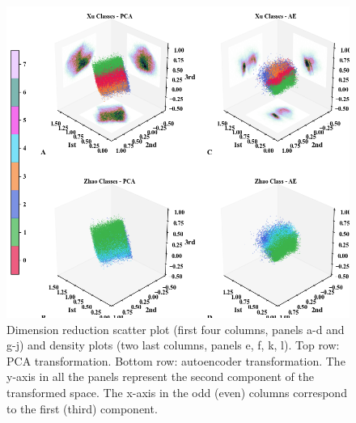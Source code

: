 \documentclass[utf8]{frontiersSCNS} %
\begin{document}
\begin{figure}[h!]
	\begin{center}
		\includegraphics[width=12cm]{Amaya/dimreduc}%
	\end{center}
	\caption{Dimension reduction scatter plot (first four columns, panels a-d and g-j) and density plots (two last columns, panels e, f, k, l). Top row: PCA transformation. Bottom row: autoencoder transformation. The y-axis in all the panels represent the second component of the transformed space. The x-axis in the odd (even) columns correspond to the first (third) component.}\label{fig:dimreduc}
\end{figure}
\end{document}
